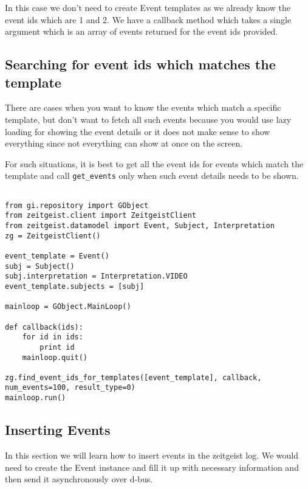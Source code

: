 In this case we don't need to create Event templates as we already know the event ids 
which are 1 and 2. We have a callback method which takes a single argument which is 
an array of events returned for the event ids provided.

\subsection{Searching for event ids which matches the template}

There are cases when you want to know the events which match a specific template, 
but don't want to fetch all such events because you would use lazy loading for showing 
the event details or it does not make sense to show everything since not everything 
can show at once on the screen.

For such situations, it is best to get all the event ids for events which match 
the template and call \texttt{get\_events} only when such event details needs to be shown.

\begin{center}
\begin{verbatim}

from gi.repository import GObject
from zeitgeist.client import ZeitgeistClient
from zeitgeist.datamodel import Event, Subject, Interpretation
zg = ZeitgeistClient()

event_template = Event()
subj = Subject()
subj.interpretation = Interpretation.VIDEO
event_template.subjects = [subj]

mainloop = GObject.MainLoop()

def callback(ids):
	for id in ids:
		print id
	mainloop.quit()

zg.find_event_ids_for_templates([event_template], callback, num_events=100, result_type=0)
mainloop.run()

\end{verbatim}
\end{center}

\subsection{Inserting Events}

In this section we will learn how to insert events in the zeitgeist log. We would need 
to create the Event instance and fill it up with necessary information and then send it 
asynchronously over d-bus.

